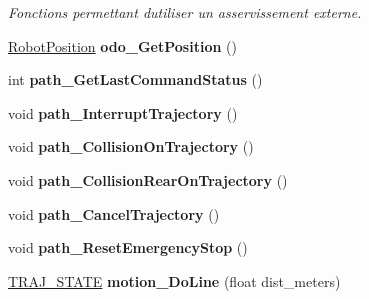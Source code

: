 \begin{DoxyCompactItemize}
\begin{DoxyCompactList}\small\item\em Fonctions permettant d\textquotesingle{}utiliser un asservissement externe. \end{DoxyCompactList}\item 
\mbox{\label{classAsservDriver__mbed__i2c_abf995178148259c44b50bfec37cb1525}} 
\hyperlink{structRobotPosition}{Robot\+Position} {\bfseries odo\+\_\+\+Get\+Position} ()
\item 
\mbox{\label{classAsservDriver__mbed__i2c_a1a05012980d5ea8ac06763d1148fa5b2}} 
int {\bfseries path\+\_\+\+Get\+Last\+Command\+Status} ()
\item 
\mbox{\label{classAsservDriver__mbed__i2c_aad59dce9726d41ec38b9f6fdef2f0270}} 
void {\bfseries path\+\_\+\+Interrupt\+Trajectory} ()
\item 
\mbox{\label{classAsservDriver__mbed__i2c_ab2402a2e1f1b0bdcaa97e25f113386d4}} 
void {\bfseries path\+\_\+\+Collision\+On\+Trajectory} ()
\item 
\mbox{\label{classAsservDriver__mbed__i2c_ad8d6942cfc649a31b9c1c3b5abc45841}} 
void {\bfseries path\+\_\+\+Collision\+Rear\+On\+Trajectory} ()
\item 
\mbox{\label{classAsservDriver__mbed__i2c_a5152ccef377fa574d699af2bb65da777}} 
void {\bfseries path\+\_\+\+Cancel\+Trajectory} ()
\item 
\mbox{\label{classAsservDriver__mbed__i2c_a22a7599761e3c381bfa767e4ddf47383}} 
void {\bfseries path\+\_\+\+Reset\+Emergency\+Stop} ()
\item 
\mbox{\label{classAsservDriver__mbed__i2c_a7d70497cf01398466de8b8a3b838a660}} 
\hyperlink{path__manager_8h_adb3360abeb29758da93865c8afcb80eb}{T\+R\+A\+J\+\_\+\+S\+T\+A\+TE} {\bfseries motion\+\_\+\+Do\+Line} (float dist\+\_\+meters)
\item 
\mbox{\label{classAsservDriver__mbed__i2c_a90b40e26cd6ef4fde1ec9fe8b3b3d217}} 

\end{DoxyCompactItemize}

